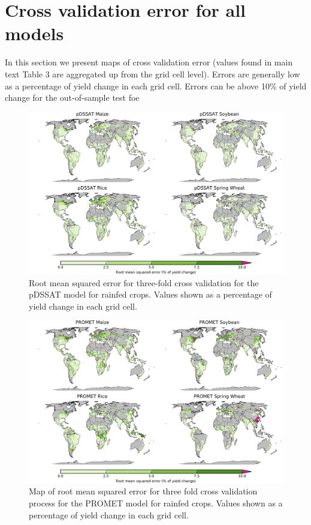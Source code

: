 \documentclass[12pt]{article}
\begin{document}
\clearpage
\section{Cross validation error for all models}
\begin{flushleft}
In this section we present maps of cross validation error (values found in main text Table 3 are aggregated up from the grid cell level). Errors are generally low as a percentage of yield change in each grid cell. Errors can be above 10\% of yield change for the out-of-sample test foe
\end{flushleft}

\begin{figure}[h!]
  \centering
  \includegraphics[width=15.5cm]{pDSSAT_spatial_MSE_ton_ha.png}
  \caption{Root mean squared error for three-fold cross validation for the pDSSAT model for rainfed crops. Values shown as a percentage of yield change in each grid cell.}
\end{figure}

\begin{figure}[h!]
  \centering
  \includegraphics[width=15.5cm]{PROMET_spatial_MSE_ton_ha.png}
  \caption{Map of root mean squared error for three fold cross validation process for the PROMET model for rainfed crops. Values shown as a percentage of yield change in each grid cell.}
\end{figure}
\end{document}
